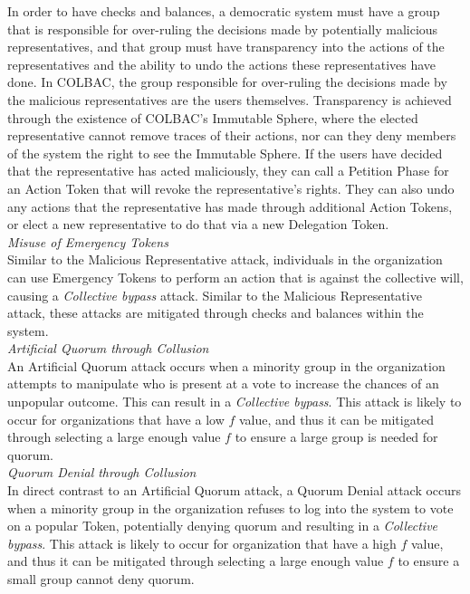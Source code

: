 In order to have checks and balances, a democratic system must have a group that
is responsible for over-ruling the decisions made by potentially malicious
representatives, and that group must have transparency into the actions of the
representatives and the ability to undo the actions these representatives have
done. In COLBAC, the group responsible for over-ruling the decisions made by the
malicious representatives are the users themselves. Transparency is achieved
through the existence of COLBAC's Immutable Sphere, where the elected
representative cannot remove traces of their actions, nor can they deny members
of the system the right to see the Immutable Sphere. If the users have decided
that the representative has acted maliciously, they can call a Petition Phase
for an Action Token that will revoke the representative's rights. They can also
undo any actions that the representative has made through additional Action
Tokens, or elect a new representative to do that via a new Delegation Token.\\

\noindent\textit{Misuse of Emergency Tokens}\mbox{}\\
Similar to the Malicious Representative attack, individuals in the organization
can use Emergency Tokens to perform an action that is against the collective
will, causing a \emph{Collective bypass} attack. Similar to the Malicious
Representative attack, these attacks are mitigated through checks and balances
within the system.\\

\noindent\textit{Artificial Quorum through Collusion}\mbox{}\\
An Artificial Quorum attack occurs when a minority group in the organization
attempts to manipulate who is present at a vote to increase the chances of an
unpopular outcome. This can result in a \emph{Collective bypass}. This attack is
likely to occur for organizations that have a low $f$ value, and thus it can
be mitigated through selecting a large enough value $f$ to ensure a large group
is needed for quorum.\\ 

\noindent\textit{Quorum Denial through Collusion}\mbox{}\\
In direct contrast to an Artificial Quorum attack, a Quorum Denial attack occurs
when a minority group in the organization refuses to log into the system to vote
on a popular Token, potentially denying quorum and resulting in a
\emph{Collective bypass}. This attack is likely to occur for organization that
have a high $f$ value, and thus it can be mitigated through selecting a large
enough value $f$ to ensure a small group cannot deny quorum.
    

